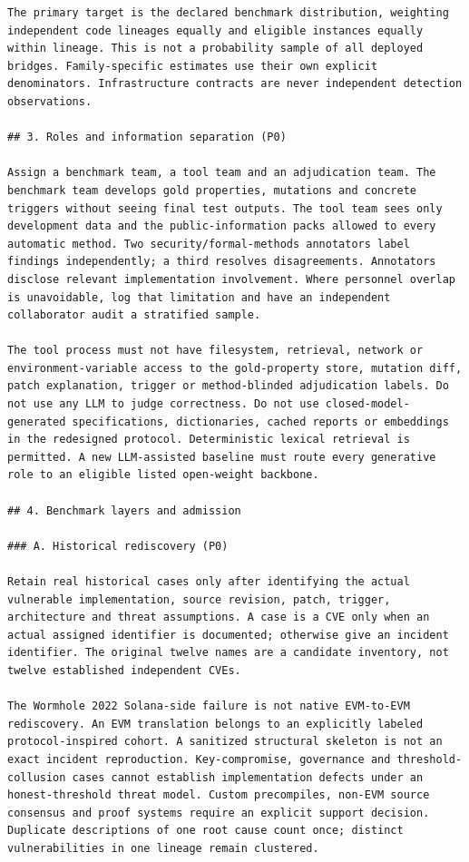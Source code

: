\documentclass[11pt,a4paper]{article}
\begin{document}
\begin{verbatim}
The primary target is the declared benchmark distribution, weighting independent code lineages equally and eligible instances equally within lineage. This is not a probability sample of all deployed bridges. Family-specific estimates use their own explicit denominators. Infrastructure contracts are never independent detection observations.

## 3. Roles and information separation (P0)

Assign a benchmark team, a tool team and an adjudication team. The benchmark team develops gold properties, mutations and concrete triggers without seeing final test outputs. The tool team sees only development data and the public-information packs allowed to every automatic method. Two security/formal-methods annotators label findings independently; a third resolves disagreements. Annotators disclose relevant implementation involvement. Where personnel overlap is unavoidable, log that limitation and have an independent collaborator audit a stratified sample.

The tool process must not have filesystem, retrieval, network or environment-variable access to the gold-property store, mutation diff, patch explanation, trigger or method-blinded adjudication labels. Do not use any LLM to judge correctness. Do not use closed-model-generated specifications, dictionaries, cached reports or embeddings in the redesigned protocol. Deterministic lexical retrieval is permitted. A new LLM-assisted baseline must route every generative role to an eligible listed open-weight backbone.

## 4. Benchmark layers and admission

### A. Historical rediscovery (P0)

Retain real historical cases only after identifying the actual vulnerable implementation, source revision, patch, trigger, architecture and threat assumptions. A case is a CVE only when an actual assigned identifier is documented; otherwise give an incident identifier. The original twelve names are a candidate inventory, not twelve established independent CVEs.

The Wormhole 2022 Solana-side failure is not native EVM-to-EVM rediscovery. An EVM translation belongs to an explicitly labeled protocol-inspired cohort. A sanitized structural skeleton is not an exact incident reproduction. Key-compromise, governance and threshold-collusion cases cannot establish implementation defects under an honest-threshold threat model. Custom precompiles, non-EVM source consensus and proof systems require an explicit support decision. Duplicate descriptions of one root cause count once; distinct vulnerabilities in one lineage remain clustered.


\end{verbatim}
\end{document}
